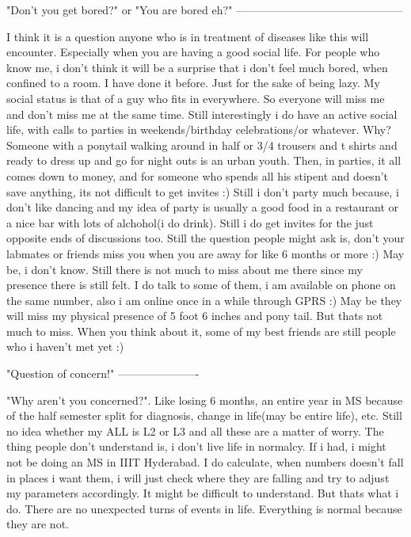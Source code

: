 "Don't you get bored?" or "You are bored eh?"
---------------------------------------------


I think it is a question anyone who is in treatment of diseases like this will encounter. Especially when you are having a good social life. For people who know me, i don't think it will be a surprise that i don't feel much bored, when confined to a room. I have done it before. Just for the sake of being lazy. My social status is that of a guy who fits in everywhere. So everyone will miss me and don't miss me at the same time. Still interestingly i do have an active social life, with calls to parties in weekends/birthday celebrations/or whatever. Why? Someone with a ponytail walking around in half or 3/4 trousers and t shirts and ready to dress up and go for night outs is an urban youth. Then, in parties, it all comes down to money, and for someone who spends all his stipent and doesn't save anything, its not difficult to get invites :) Still i don't party much because, i don't like dancing and my idea of party is usually a good food in a restaurant or a nice bar with lots of alchohol(i do drink). Still i do get invites for the just opposite ends of discussions too. Still the question people might ask is, don't your labmates or friends miss you when you are away for like 6 months or more :) May be, i don't know. Still there is not much to miss about me there since my presence there is still felt. I do talk to some of them, i am available on phone on the same number, also i am online once in a while through GPRS :) May be they will miss my physical presence of 5 foot 6 inches and pony tail. But thats not much to miss. When you think about it, some of my best friends are still people who i haven't met yet :) 

"Question of concern!"
----------------------

"Why aren't you concerned?". Like losing 6 months, an entire year in MS because of the half semester split for diagnosis, change in life(may be entire life), etc. Still no idea whether my ALL is L2 or L3 and all these are a matter of worry. The thing people don't understand is, i don't live life in normalcy. If i had, i might not be doing an MS in IIIT Hyderabad. I do calculate, when numbers doesn't fall in places i want them, i will just check where they are falling and try to adjust my parameters accordingly. It might be difficult to understand. But thats what i do. There are no unexpected turns of events in life. Everything is normal because they are not.


